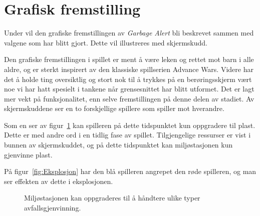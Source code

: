 \section{Grafisk fremstilling}\label{sec:artwork}
Under vil den grafiske fremstillingen av \emph{Garbage Alert} bli beskrevet
sammen med valgene som har blitt gjort. Dette vil illustreres med
skjermskudd.

Den grafiske fremstillingen i spillet er ment å være leken og rettet mot
barn i alle aldre, og er sterkt inspirert av den klassiske spillserien
Advance Wars. Videre har det å holde ting oversiktlig og stort nok til å
trykkes på en berøringsskjerm vært noe vi har hatt spesielt i tankene
når grensesnittet har blitt utformet. Det er lagt mer vekt på
funksjonalitet, enn selve fremstillingen på denne delen av stadiet. Av
skjermskuddene ser en to forskjellige spillere som spiller mot
hverandre.

Som en ser av figur~\ref{fig:Oppgradering} kan spilleren på dette
tidspunktet kun oppgradere til plast. Dette er med andre ord i en tidlig
fase av spillet. Tilgjengelige ressurser er vist i bunnen av
skjermskuddet, og på dette tidspunktet kan miljøstasjonen kun gjenvinne
plast.

På figur~\ref{fig:Eksplosjon} har den blå spilleren angrepet den røde
spilleren, og man ser effekten av dette i eksplosjonen.

\begin{figure} [H]
\centering
\setlength\fboxsep{0.2pt}
\setlength\fboxrule{0.7pt}
\caption{Miljøstasjonen kan oppgraderes til å håndtere ulike typer avfallsgjenvinning.}
\label{fig:Oppgradering}
\end{figure}


